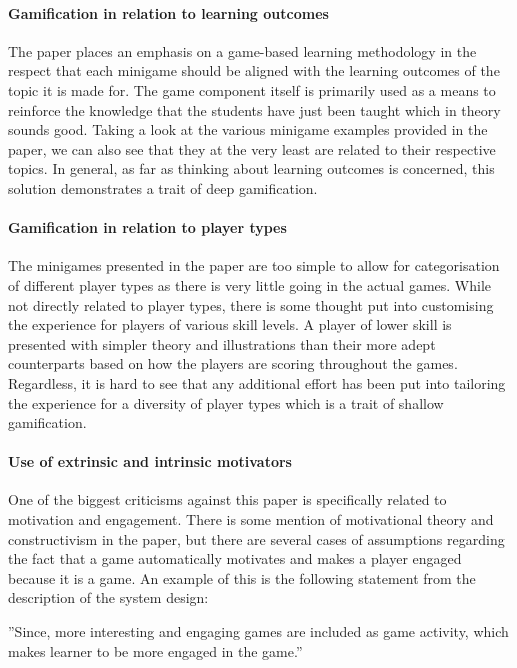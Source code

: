 \paragraph{Gamification in relation to learning outcomes}
The paper places an emphasis on a game-based learning methodology in the respect that each minigame should be aligned with the learning outcomes of the topic it is made for. The game component itself is primarily used as a means to reinforce the knowledge that the students have just been taught which in theory sounds good. Taking a look at the various minigame examples provided in the paper, we can also see that they at the very least are related to their respective topics. In general, as far as thinking about learning outcomes is concerned, this solution demonstrates a trait of deep gamification.  

\paragraph{Gamification in relation to player types}
The minigames presented in the paper are too simple to allow for categorisation of different player types as there is very little going in the actual games. While not directly related to player types, there is some thought put into customising the experience for players of various skill levels. A player of lower skill is presented with simpler theory and illustrations than their more adept counterparts based on how the players are scoring throughout the games. Regardless, it is hard to see that any additional effort has been put into tailoring the experience for a diversity of player types which is a trait of shallow gamification. 

\paragraph{Use of extrinsic and intrinsic motivators}
One of the biggest criticisms against this paper is specifically related to motivation and engagement. There is some mention of motivational theory and constructivism in the paper, but there are several cases of assumptions regarding the fact that a game automatically motivates and makes a player engaged because it is a game. An example of this is the following statement from the description of the system design: 
\begin{displayquote}
''Since, more interesting and engaging games are included as game activity, which makes learner to be more engaged in the game.''
\end{displayquote}

